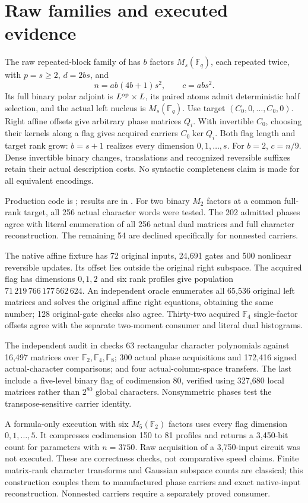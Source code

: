 \documentclass[11pt]{article}
\newcommand{\F}{\mathbb F}\newcommand{\rank}{\operatorname{rank}}
\begin{document}
\section{Raw families and executed evidence}
The raw repeated-block family of
 has $b$ factors $M_s(\F_q)$,
each repeated twice, with $p=s\ge2$, $d=2bs$, and
\[
 n=ab(4b+1)s^2,\qquad c=ab s^2.
\]
Its full binary polar adjoint is $L^{\rm op}\times L$, its paired atoms
admit deterministic half selection, and the actual left nucleus is
$M_s(\F_q)$. Use target $(C_0,0,\ldots,C_0,0)$. Right affine offsets
give arbitrary phase matrices $Q_i$. With invertible $C_0$, choosing their
kernels along a flag gives acquired carriers $C_0\ker Q_i$.
Both flag length and target rank grow: $b=s+1$ realizes every dimension
$0,1,\ldots,s$. For $b=2$, $c=n/9$. Dense invertible binary changes,
translations and recognized reversible suffixes retain their actual
description costs. No syntactic completeness claim is made for all
equivalent encodings.

Production code is ; results are in
. For two binary $M_2$ factors
at a common full-rank target, all 256 actual character words were tested.
The 202 admitted phases agree with literal enumeration of all 256 actual
dual matrices and full character reconstruction. The remaining 54 are
declined specifically for nonnested carriers.

The native affine fixture has 72 original inputs, 24,691 gates and 500
nonlinear reversible updates. Its offset lies outside the original right
subspace. The acquired flag has dimensions $0,1,2$ and six rank profiles
give population $71\,219\,766\,177\,562\,624$.
An independent oracle enumerates all 65,536 original left matrices and
solves the original affine right equations, obtaining the same number;
128 original-gate checks also agree. Thirty-two acquired $\F_4$
single-factor offsets agree with the separate two-moment consumer and
literal dual histograms.

The independent audit in
checks 63 rectangular character polynomials against 16,497 matrices over
$\F_2,\F_4,\F_8$; 300 actual phase acquisitions and 172,416 signed
actual-character comparisons; and four actual-column-space transfers.
The last include a five-level binary flag of codimension 80, verified
using 327,680 local matrices rather than $2^{80}$ global characters.
Nonsymmetric phases test the transpose-sensitive carrier identity.

A formula-only execution with six $M_5(\F_2)$ factors uses every flag
dimension $0,1,\ldots,5$. It compresses codimension 150 to 81 profiles
and returns a 3,450-bit count for parameters with $n=3750$.
Raw acquisition of a 3,750-input circuit was not executed. These are
correctness checks, not comparative speed claims. Finite matrix-rank
character transforms and Gaussian subspace counts are classical; this
construction couples them to manufactured phase carriers and exact
native-input reconstruction. Nonnested carriers require a separately
proved consumer.
\end{document}
